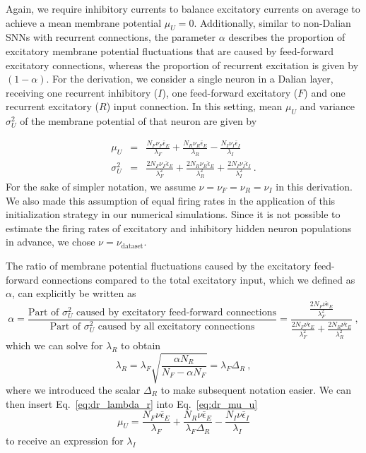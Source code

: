 \documentclass[11pt,a4paper]{article}
\begin{document}
Again, we require inhibitory currents to balance excitatory currents on average to achieve a mean membrane potential $\mu_U = 0$. 
Additionally, similar to non-Dalian \acp{SNN} with recurrent connections, the parameter $\alpha$ describes the proportion of excitatory membrane potential fluctuations that are caused by feed-forward excitatory connections, whereas the proportion of recurrent excitation is given by $(1-\alpha)$.
For the derivation, we consider a single neuron in a Dalian layer, receiving one recurrent inhibitory ($I$), one feed-forward excitatory ($F$) and one recurrent excitatory ($R$) input connection. In this setting, mean $\mu_U$ and variance $\sigma_U^2$ of the membrane potential of that neuron are given by

\begin{eqnarray}
\mu_U &=& \frac{N_{F}\nu_F\bar\epsilon_{E}}{\lambda_F} + \frac{N_{R}\nu_R\bar\epsilon_{E}}{\lambda_R} - \frac{N_{I}\nu_I\bar\epsilon_{I}}{\lambda_I} 
\label{eq:dr_mu_u}\\
\sigma^2_{U}&=&\frac{2 N_{F}\nu_F\hat\epsilon_{E}}{\lambda_F^2} + \frac{2 N_{R}\nu_R\hat\epsilon_{E}}{\lambda_R^2} + \frac{2 N_{I}\nu_I\hat\epsilon_{I}}{\lambda_I^2} ~ .
\label{eq:dr_sigma_U}
\end{eqnarray}
For the sake of simpler notation, we assume $\nu = \nu_F=\nu_R=\nu_I$ in this derivation. 
We also made this assumption of equal firing rates in the application of this initialization strategy in our numerical simulations. Since it is not possible to estimate the firing rates of excitatory and inhibitory hidden neuron populations in advance, we chose $\nu= \nu_{\text{dataset}}$.

The ratio of membrane potential fluctuations caused by the excitatory feed-forward connections compared to the total excitatory input, which we defined as $\alpha$, can explicitly be written as
\begin{equation}
\alpha = \frac{\text{Part of }\sigma_U^2 \text{ caused by excitatory feed-forward connections}}{\text{Part of }\sigma_U^2 \text{ caused by all excitatory connections}} = \frac{ \frac{2 N_{F}\nu\hat\epsilon_{E}}{\lambda_F^2} }{ \frac{2 N_{F}\nu\hat\epsilon_{E}}{\lambda_F^2} + \frac{2 N_{R}\nu\hat\epsilon_{E}}{\lambda_R^2} } ~ ,
\end{equation}
which we can solve for $\lambda_R$ to obtain
\begin{equation}
\lambda_R = \lambda_F \sqrt{ \frac{\alpha N_R}{N_F - \alpha N_F} } = \lambda_F\Delta_{R}  ~,
\label{eq:dr_lambda_r}
\end{equation}
where we introduced the scalar $\Delta_R$ to make subsequent notation easier. We can then insert Eq.~\eqref{eq:dr_lambda_r} into Eq.~\eqref{eq:dr_mu_u}
\begin{equation}
\mu_U = \frac{N_{F}\nu\bar\epsilon_{E}}{\lambda_F} + \frac{N_{R}\nu\bar\epsilon_{E}}{\lambda_F\Delta_{R}} - \frac{N_{I}\nu\bar\epsilon_{I}}{\lambda_I}
\end{equation}
to receive an expression for $\lambda_I$
\end{document}
